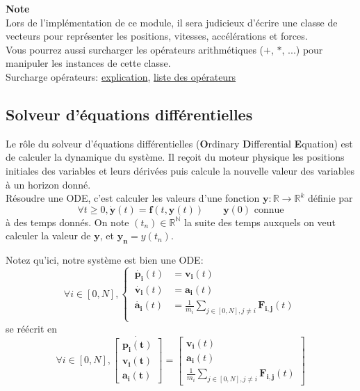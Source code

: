 \documentclass{article}
\newcommand{\myvec}[1]{\ensuremath{\mathbf{#1}}}
\begin{document}
\noindent\textbf{Note} \\
Lors de l'implémentation de ce module, il sera judicieux d'écrire une classe de vecteurs pour représenter les positions, vitesses, accélérations et forces. \\
Vous pourrez aussi surcharger les opérateurs arithmétiques ($+$, $*$, ...) pour manipuler les instances de cette classe.\\
Surcharge opérateurs: \href{https://openclassrooms.com/fr/courses/235344-apprenez-a-programmer-en-python/233046-appliquez-des-methodes-speciales#/id/r-232928}{explication}, \href{https://docs.python.org/fr/3/library/operator.html}{liste des opérateurs}

\subsection{Solveur d'équations différentielles}
\label{solveur}

Le rôle du solveur d'équations différentielles (\textbf{O}rdinary \textbf{D}ifferential \textbf{E}quation) est de calculer la dynamique du système. Il reçoit du moteur physique les positions initiales des variables et leurs dérivées puis calcule la nouvelle valeur des variables à un horizon donné.\\
Résoudre une ODE, c'est calculer les valeurs d'une fonction $\myvec{y} : \mathbb{R} \rightarrow \mathbb{R}^k$ définie par
\begin{equation*}
\forall t \ge 0, \myvec{\dot{y}}(t) = \myvec{f}(t, \myvec{y}(t)) \quad\quad \myvec{y}(0) \text{ connue}
\end{equation*}
à des temps donnés. On note $(t_n) \in \mathbb{R}^\mathbb{N}$ la suite des temps auxquels on veut calculer la valeur de $\myvec{y}$, et $\myvec{y_n} = y(t_n)$.

\vspace{1em}

\noindent Notez qu'ici, notre système est bien une ODE:
\begin{equation*}
    \forall i \in [0,N], \left\{\begin{aligned}
    \ \myvec{\dot{p_i}}(t) & = \myvec{v_i}(t) \\
    \ \myvec{\dot{v_i}}(t) & = \myvec{a_i}(t) \\
    \ \myvec{\dot{a_i}}(t) & = \frac{1}{m_i} \sum_{j \in [0,N], j \ne i} \myvec{F_{i,j}}(t) \\
    \end{aligned}\right.
\end{equation*}
se réécrit en
\begin{equation*}
    \forall i \in [0,N], \myvec{\dot{\left[\begin{aligned}
        \myvec{p_i}(t) \\ \myvec{v_i}(t) \\ \myvec{a_i}(t)
    \end{aligned}\right]}} =
    \left[\begin{gathered}
    \myvec{v_i}(t) \\ \myvec{a_i}(t) \\ \frac{1}{m_i} \sum_{j \in [0,N], j \ne i} \myvec{F_{i,j}}(t)
    \end{gathered}\right]
\end{equation*}
\end{document}
